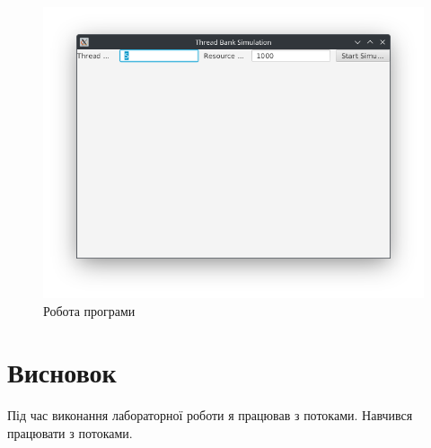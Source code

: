 \documentclass[14pt]{extreport}
\begin{document}
\begin{normalsize}
	\begin{figure}[H]
		\centering
		\includegraphics[scale=0.55]{1}
		\caption{Робота програми}
	\end{figure}

	\section*{Висновок}
	Під час виконання лабораторної роботи я працював з потоками. Навчився працювати з потоками.
	 
\end{normalsize}
\end{document}
